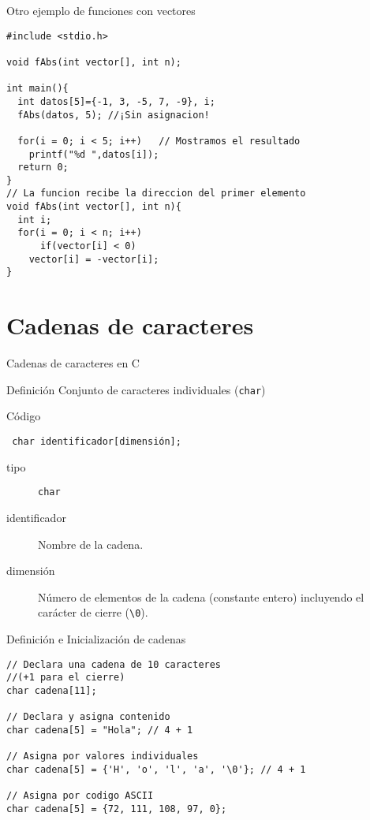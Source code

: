 \documentclass[xcolor={usenames,svgnames,dvipsnames}, aspectratio=169]{beamer}
\begin{document}
\begin{frame}[label={sec:org12deda4},fragile,plain]{Otro ejemplo de funciones con vectores}
 \lstset{language=C,label= ,caption= ,captionpos=b,numbers=none}
\begin{lstlisting}
#include <stdio.h>

void fAbs(int vector[], int n);

int main(){
  int datos[5]={-1, 3, -5, 7, -9}, i;
  fAbs(datos, 5); //¡Sin asignacion!

  for(i = 0; i < 5; i++)   // Mostramos el resultado
    printf("%d ",datos[i]);
  return 0;
}
// La funcion recibe la direccion del primer elemento
void fAbs(int vector[], int n){
  int i;
  for(i = 0; i < n; i++)
      if(vector[i] < 0)
	vector[i] = -vector[i];
}
\end{lstlisting}
\end{frame}

\section{Cadenas de caracteres}
\label{sec:org1222c9b}
\begin{frame}[label={sec:orgffb4595},fragile]{Cadenas de caracteres en C}
 \begin{block}{Definición}
Conjunto de caracteres individuales (\texttt{char})
\end{block}
\begin{block}{Código}
\lstset{language=C,label= ,caption= ,captionpos=b,numbers=none}
\begin{lstlisting}
 char identificador[dimensión];
\end{lstlisting}

\begin{description}
\item[{tipo}] \texttt{char}
\item[{identificador}] Nombre de la cadena.
\item[{dimensión}] Número de elementos de la cadena (constante entero) \alert{incluyendo el carácter de cierre} (\texttt{\textbackslash{}0}).
\end{description}
\end{block}
\end{frame}

\begin{frame}[label={sec:org3124796},fragile]{Definición e Inicialización de cadenas}
 \lstset{language=C,label= ,caption= ,captionpos=b,numbers=none}
\begin{lstlisting}
// Declara una cadena de 10 caracteres 
//(+1 para el cierre)
char cadena[11];

// Declara y asigna contenido
char cadena[5] = "Hola"; // 4 + 1

// Asigna por valores individuales
char cadena[5] = {'H', 'o', 'l', 'a', '\0'}; // 4 + 1

// Asigna por codigo ASCII
char cadena[5] = {72, 111, 108, 97, 0}; 

\end{lstlisting}
\end{frame}
\end{document}
